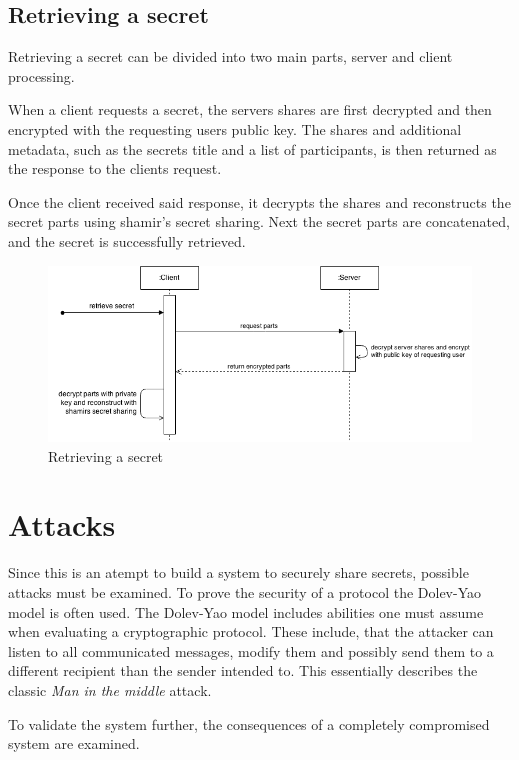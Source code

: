 \subsection{Retrieving a secret}

Retrieving a secret can be divided into two main parts, server and client
processing.

When a client requests a secret, the servers shares are first decrypted and
then encrypted with the requesting users public key. The shares and additional
metadata, such as the secrets title and a list of participants, is then
returned as the response to the clients request.

Once the client received said response, it decrypts the shares and reconstructs
the secret parts using shamir's secret sharing. Next the secret parts are
concatenated, and the secret is successfully retrieved.

\begin{figure}
  \includegraphics[scale=0.55]{pictures/retrieve_secret_sequence_diagram.png}
  \caption{Retrieving a secret}
  \label{fig:retrieving_a_secret}
\end{figure}

\section{Attacks}

Since this is an atempt to build a system to securely share secrets, possible
attacks must be examined. To prove the security of a protocol the Dolev-Yao
model is often used. The Dolev-Yao model includes abilities one must assume
when evaluating a cryptographic protocol. These include, that the attacker can
listen to all communicated messages, modify them and possibly send them to a
different recipient than the sender intended to. This essentially describes the
classic \textit{Man in the middle} attack.

To validate the system further, the consequences of a completely compromised
system are examined.

